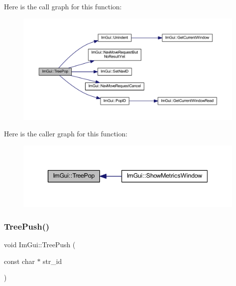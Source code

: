 Here is the call graph for this function\+:
\nopagebreak
\begin{figure}[H]
\begin{center}
\leavevmode
\includegraphics[width=350pt]{namespace_im_gui_a41ecf265e5f678c78fc9c30b3cf2077f_cgraph}
\end{center}
\end{figure}
Here is the caller graph for this function\+:
\nopagebreak
\begin{figure}[H]
\begin{center}
\leavevmode
\includegraphics[width=339pt]{namespace_im_gui_a41ecf265e5f678c78fc9c30b3cf2077f_icgraph}
\end{center}
\end{figure}
\mbox{\label{namespace_im_gui_a30b5df3be04a6e712985612bbdea6656}} 
\subsubsection{\texorpdfstring{Tree\+Push()}{TreePush()}\hspace{0.1cm}{\footnotesize\ttfamily [1/2]}}
{\footnotesize\ttfamily void Im\+Gui\+::\+Tree\+Push (\begin{DoxyParamCaption}\item[{const char $\ast$}]{str\+\_\+id }\end{DoxyParamCaption})}

